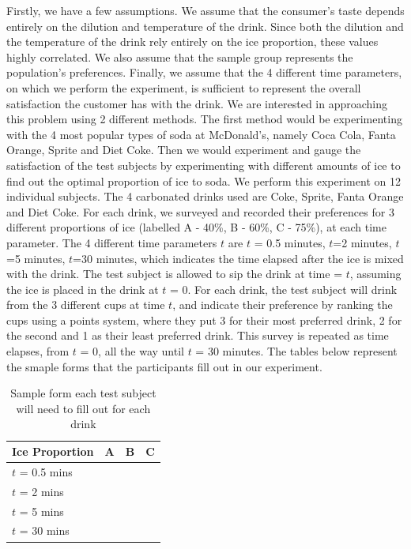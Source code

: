 \documentclass[oneside,12pt]{report}
\begin{document}
Firstly, we have a few assumptions. We assume that the consumer's taste depends entirely on the dilution and temperature of the drink. Since both the dilution and the temperature of the drink rely entirely on the ice proportion, these values highly correlated. We also assume that the sample group represents the population's preferences. Finally, we assume that the 4 different time parameters, on which we perform the experiment, is sufficient to represent the overall satisfaction the customer has with the drink.
\vspace{12pt}
\newline
We are interested in approaching this problem using 2 different methods. The first method would be experimenting with the 4 most popular types of soda at McDonald's, namely Coca Cola, Fanta Orange, Sprite and Diet Coke. Then we would experiment and gauge the satisfaction of the test subjects by experimenting with different amounts of ice to find out the optimal proportion of ice to soda. 
\vspace{12pt}
\newline
We perform this experiment on 12 individual subjects. The 4 carbonated drinks used are Coke, Sprite, Fanta Orange and Diet Coke. For each drink, we surveyed and recorded their preferences for 3 different proportions of ice (labelled A - 40\%, B - 60\%, C - 75\%), at each time parameter. The 4 different time parameters $t$ are $t$ = 0.5 minutes, $t$=2 minutes, $t$=5 minutes, $t$=30 minutes, which indicates the time elapsed after the ice is mixed with the drink. The test subject is allowed to sip the drink at time = $t$, assuming the ice is placed in the drink at $t$ = 0. 
\vspace{12pt}
\newline
For each drink, the test subject will drink from the 3 different cups at time $t$, and indicate their preference by ranking the cups using a points system, where they put 3 for their most preferred drink, 2 for the second and 1 as their least preferred drink. This survey is repeated as time elapses, from $t$ = 0, all the way until $t$ = 30 minutes. The tables below represent the smaple forms that the participants fill out in our experiment. 

\pagebreak
\vspace{2pt}
\begin{table}[ h]
\centering
\begin{tabular}{ l | c|c|c }
  Ice Proportion & A  & B & C  \\
\hline  
$t$ = 0.5 mins & & &\\ 
\hline  
$t$ = 2 mins & & &\\ 
\hline  
$t$ = 5 mins  & & &\\ 
\hline  
$t$ = 30 mins & & &\\ 
\hline  
   
 \end{tabular}
\caption{Sample form each test subject will need to fill out for each drink}

\end{table}
\end{document}

